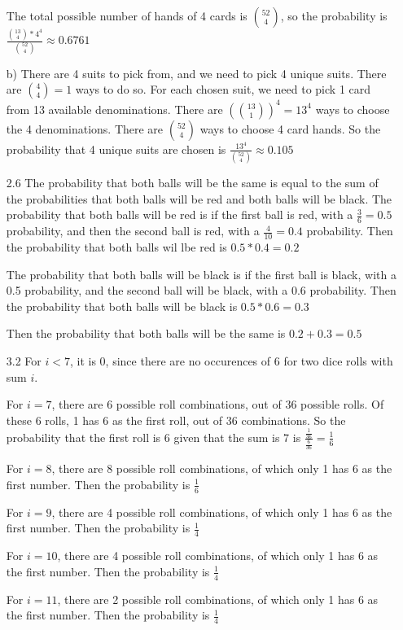 \documentclass[11pt]{article}
\begin{document}
\begin{itemize}
	The total possible number of hands of 4 cards is $\binom{52}{4}$, so the probability is $\frac{\binom{13}{4}*4^4}{\binom{52}{4}} \approx 0.6761$

	b) There are 4 suits to pick from, and we need to pick 4 unique suits. There are $\binom{4}{4} = 1$ ways to do so. For each chosen suit, we need to pick 1 card from 13 available denominations. There are $(\binom{13}{1})^4 = 13^4$ ways to choose the 4 denominations. There are $\binom{52}{4}$ ways to choose 4 card hands. So the probability that 4 unique suits are chosen is $\frac{13^4}{\binom{52}{4}} \approx 0.105$
\item[2.6]
	The probability that both balls will be the same is equal to the sum of the probabilities that both balls will be red and both balls will be black. The probability that both balls will be red is if the first ball is red, with a $\frac{3}{6} = 0.5$ probability, and then the second ball is red, with a $\frac{4}{10} = 0.4$ probability. Then the probability that both balls wil lbe red is $0.5*0.4 = 0.2$

	The probability that both balls will be black is if the first ball is black, with a 0.5 probability, and the second ball will be black, with a 0.6 probability. Then the probability that both balls will be black is $0.5 * 0.6 = 0.3$

	Then the probability that both balls will be the same is $0.2 + 0.3 = 0.5$
\item[3.2]
	For $i < 7$, it is 0, since there are no occurences of 6 for two dice rolls with sum $i$.

	For $i = 7$, there are 6 possible roll combinations, out of 36 possible rolls. Of these 6 rolls, 1 has 6 as the first roll, out of 36 combinations. So the probability that the first roll is 6 given that the sum is 7 is $\frac{\frac{1}{36}}{\frac{6}{36}} = \frac{1}{6}$

	For $i = 8$, there are 8 possible roll combinations, of which only 1 has 6 as the first number. Then the probability is $\frac{1}{6}$

	For $i = 9$, there are 4 possible roll combinations, of which only 1 has 6 as the first number. Then the probability is $\frac{1}{4}$

	For $i = 10$, there are 4 possible roll combinations, of which only 1 has 6 as the first number. Then the probability is $\frac{1}{4}$

	For $i = 11$, there are 2 possible roll combinations, of which only 1 has 6 as the first number. Then the probability is $\frac{1}{4}$


\end{itemize}
\end{document}
